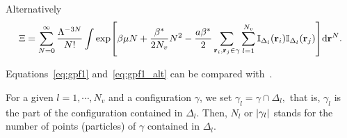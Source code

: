 \documentclass[12pt]{article}
\numberwithin{equation}{section}
\begin{document}
	\begin{mdframed}[linecolor=black,linewidth=1pt,leftline=true]
	Alternatively
		\begin{equation}
			\label{eq:gpf1_alt}
			\Xi = \sum_{N=0}^{\infty} \frac{\Lambda^{-3N}}{N!}
			\int
			\exp[\beta\mu N + \frac{\beta^*}{2N_{v}} N^2 - \frac{a\beta^*}{2} \sum_{\vb{r}_i,\vb{r}_j \in \gamma} \sum_{l=1}^{N_v} \mathbb{I}_{\Delta_l}(\vb{r}_i)\mathbb{I}_{\Delta_l}(\vb{r}_j)] {\rm d} \vb{r}^N.
		\end{equation}
	\end{mdframed}
	Equations~\eqref{eq:gpf1} and~\eqref{eq:gpf1_alt} can be compared with~\cite[(2.5)]{KKD20}.
	
	For a given $l = 1, \cdots , N_v$ and a configuration $\gamma$, we set $\gamma_l = \gamma \cap \Delta_l,$ that is, $\gamma_l$ is the part of the configuration contained in $\Delta_l$. Then, $N_l$ or $\abs{\gamma_l}$ stands for the number of points (particles) of $\gamma$ contained in $\Delta_l$.
	
\end{document}
